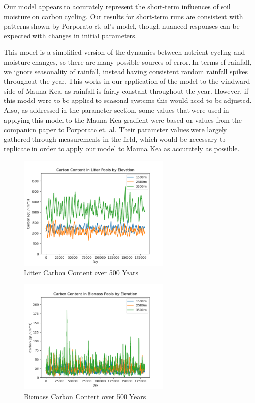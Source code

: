 \documentclass[12pt, letterpaper]{article}
\begin{document}
Our model appears to accurately represent the short-term influences of soil moisture on carbon cycling. Our results for short-term runs are consistent with patterns shown by Porporato et. al’s model, though nuanced responses can be expected with changes in initial parameters. \cite{porporato_hydrologic_2003,dodorico_hydrologic_2003}

This model is a simplified version of the dynamics between nutrient cycling and moisture changes, so there are many possible sources of error. In terms of rainfall, we ignore seasonality of rainfall, instead having consistent random rainfall spikes throughout the year. This works in our application of the model to the windward side of Mauna Kea, as rainfall is fairly constant throughout the year. \cite{giambelluca_online_2013} However, if this model were to be applied to seasonal systems this would need to be adjusted. Also, as addressed in the parameter section, some values that were used in applying this model to the Mauna Kea gradient were based on values from the companion paper to Porporato et. al. \cite{dodorico_hydrologic_2003} Their parameter values were largely gathered through measurements in the field, which would be necessary to replicate in order to apply our model to Mauna Kea as accurately as possible.



{}


\begin{figure}[p]
    \centering
    \includegraphics[width=0.67\textwidth]{litter500years.png}
    \caption{Litter Carbon Content over 500 Years}
    \label{fig:my_label}
\end{figure}

\begin{figure}[p]
    \centering
    \includegraphics[width=0.67\textwidth]{biomass500years.png}
    \caption{Biomass Carbon Content over 500 Years}
    \label{fig:my_label}
\end{figure}
\end{document}
